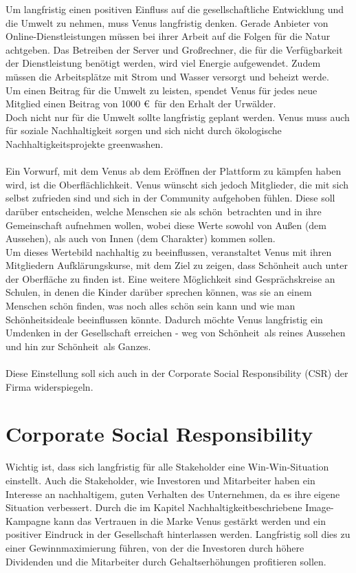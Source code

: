 \documentclass[a4paper, fontsize=12pt, parskip=full, toc=bibliographynumbered]{scrreprt}
\begin{document}
Um langfristig einen positiven Einfluss auf die gesellschaftliche Entwicklung und die Umwelt zu nehmen, muss Venus langfristig denken.
Gerade Anbieter von Online-Dienstleistungen müssen bei ihrer Arbeit auf die Folgen für die Natur achtgeben. Das Betreiben der Server und
Großrechner, die für die Verfügbarkeit der Dienstleistung benötigt werden, wird viel Energie aufgewendet. Zudem müssen die Arbeitsplätze mit Strom 
und Wasser versorgt und beheizt werde.\\
Um einen Beitrag für die Umwelt zu leisten, spendet Venus für jedes neue Mitglied einen Beitrag von 1000 \euro~für den Erhalt der Urwälder. \\
Doch nicht nur für die Umwelt sollte langfristig geplant werden. Venus muss auch für soziale Nachhaltigkeit sorgen und sich nicht durch ökologische Nachhaltigkeitsprojekte \glqq greenwashen\grqq.\\
\\
Ein Vorwurf, mit dem Venus ab dem Eröffnen der Plattform zu kämpfen haben wird, ist die \glqq Oberflächlichkeit\grqq. Venus wünscht sich jedoch Mitglieder, die mit sich selbst zufrieden sind und sich in der Community aufgehoben fühlen. Diese soll darüber entscheiden, welche Menschen sie als \glqq schön\grqq~betrachten und in ihre Gemeinschaft aufnehmen wollen, wobei diese Werte sowohl von Außen (dem Aussehen), als auch von Innen (dem Charakter) kommen sollen.\\
Um dieses Wertebild nachhaltig zu beeinflussen, veranstaltet Venus mit ihren Mitgliedern Aufklärungskurse, mit dem Ziel zu zeigen, dass Schönheit auch unter der Oberfläche zu finden ist. Eine weitere Möglichkeit sind Gesprächskreise an Schulen, in denen die Kinder darüber sprechen können, was sie an einem Menschen schön finden, was noch alles schön sein kann und wie man Schönheitsideale beeinflussen könnte. Dadurch möchte Venus langfristig ein Umdenken in der Gesellschaft erreichen - weg von \glqq Schönheit\grqq~als reines Aussehen und hin zur \glqq Schönheit\grqq~als Ganzes.\\
\\
Diese Einstellung soll sich auch in der Corporate Social Responsibility (CSR) der Firma widerspiegeln.

\section{Corporate Social Responsibility}

Wichtig ist, dass sich langfristig für alle Stakeholder eine Win-Win-Situation einstellt. Auch die Stakeholder, wie Investoren und Mitarbeiter haben ein Interesse an nachhaltigem, guten Verhalten des Unternehmen, da es ihre eigene Situation verbessert. Durch die im Kapitel \glqq Nachhaltigkeit\grqq beschriebene Image-Kampagne kann das
Vertrauen in die Marke Venus gestärkt werden und ein positiver Eindruck in der Gesellschaft hinterlassen werden. Langfristig soll dies zu einer Gewinnmaximierung führen, von der die Investoren durch höhere Dividenden und die Mitarbeiter durch Gehaltserhöhungen profitieren sollen.
\end{document}
